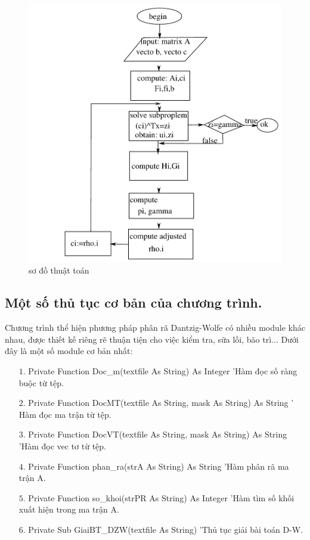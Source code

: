 \begin{figure}[!ht]
\begin{center}
\includegraphics{sodokhoi.pdf}
\caption{sơ đồ thuật toán}\label{fig:}
\end{center}
\end{figure}

\subsection{Một số thủ tục cơ bản của chương trình. }
Chương trình thể hiện phương pháp phân rã Dantzig-Wolfe có nhiều module khác nhau, được thiết kế riêng rẽ thuận tiện cho việc kiểm tra, sữa lồi, bão trì... Dưới đây là một số module cơ bản nhất:
\begin{itemize}
\item[$1.$] Private Function Doc\_m(textfile As String) As Integer 'Hàm đọc số ràng buộc từ tệp.
\item[$2.$] Private Function DocMT(textfile As String, mask As String) As String ' Hàm đọc ma trận từ tệp.
\item[$3.$] Private Function DocVT(textfile As String, mask As String) As String 'Hàm đọc vec tơ từ tệp.
\item[$4.$] Private Function phan\_ra(strA As String) As String 'Hàm phân rã ma trận A.
\item[$5.$] Private Function so\_khoi(strPR As String) As Integer 'Hàm tìm số khối xuất hiện trong ma trận A.
\item[$6.$] Private Sub GiaiBT\_DZW(textfile As String) 'Thủ tục giải bài toán D-W.
\end{itemize}


